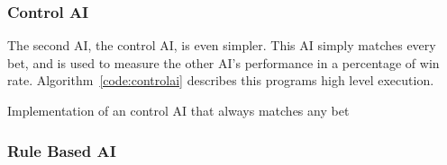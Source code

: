 \subsubsection{Control AI}

The second AI, the control AI, is even simpler. This AI simply matches every
bet, and is used to measure the other AI's performance in a percentage of
win rate. Algorithm~\ref{code:controlai} describes this programs high level
execution.

\vspace{0.3cm}

\begin{algorithm}[H]
    \BlankLine{}
     
\caption{Implementation of an control AI that always matches any bet}%
\label{code:controlai}
\end{algorithm}

\vspace{0.3cm}

\subsubsection{Rule Based AI}

